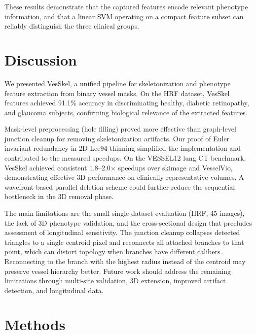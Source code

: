 \documentclass[11pt]{article}
\begin{document}
These results demonstrate that the captured features encode relevant
phenotype information, and that a linear SVM operating on a compact
feature subset can reliably distinguish the three clinical groups.

\section{Discussion}\label{sec:discussion}

We presented VesSkel, a unified pipeline for skeletonization and
phenotype feature extraction from binary vessel masks. On the HRF
dataset, VesSkel features achieved 91.1\% accuracy in discriminating
healthy, diabetic retinopathy, and glaucoma subjects, confirming
biological relevance of the extracted features.

Mask-level preprocessing (hole filling) proved more effective than
graph-level junction cleanup for removing skeletonization artifacts.
Our proof of Euler invariant redundancy in 2D Lee94 thinning
simplified the implementation and contributed to the measured
speedups. On the VESSEL12 lung CT benchmark, VesSkel achieved
consistent 1.8--2.0$\times$ speedups over skimage and VesselVio,
demonstrating effective 3D performance on clinically representative
volumes. A wavefront-based parallel deletion scheme could further
reduce the sequential bottleneck in the 3D removal phase.

The main limitations are the small single-dataset evaluation (HRF, 45
images), the lack of 3D phenotype validation, and the cross-sectional
design that precludes assessment of longitudinal sensitivity. The
junction cleanup collapses detected triangles to a single centroid
pixel and reconnects all attached branches to that point, which can
distort topology when branches have different calibers. Reconnecting
to the branch with the highest radius instead of the centroid may
preserve vessel hierarchy better. Future work should address the
remaining limitations through multi-site validation, 3D extension,
improved artifact detection, and longitudinal data.

\section{Methods}\label{sec:methods}
\end{document}
